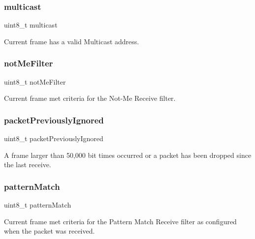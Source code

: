 \subsubsection{\texorpdfstring{multicast}{multicast}}
{\footnotesize\ttfamily uint8\+\_\+t multicast}



Current frame has a valid Multicast address. 

\mbox{\label{struct_r_s_v___a3c6d714f4e9f6e6a8f1d5ab5cf3d4b58}} 
\subsubsection{\texorpdfstring{notMeFilter}{notMeFilter}}
{\footnotesize\ttfamily uint8\+\_\+t not\+Me\+Filter}



Current frame met criteria for the Not-\/\+Me Receive filter. 

\mbox{\label{struct_r_s_v___a91c26b9645e5edca1e4c4f13c76631a2}} 
\subsubsection{\texorpdfstring{packetPreviouslyIgnored}{packetPreviouslyIgnored}}
{\footnotesize\ttfamily uint8\+\_\+t packet\+Previously\+Ignored}



A frame larger than 50,000 bit times occurred or a packet has been dropped since the last receive. 

\mbox{\label{struct_r_s_v___a0b0c5f947dcfec316373912a9d8afad0}} 
\subsubsection{\texorpdfstring{patternMatch}{patternMatch}}
{\footnotesize\ttfamily uint8\+\_\+t pattern\+Match}



Current frame met criteria for the Pattern Match Receive filter as configured when the packet was received. 

